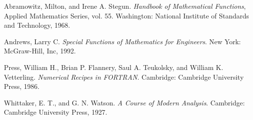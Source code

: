 \documentclass{article}
\begin{document}
\begin{thebibliography}{99}

 Abramowitz, Milton, and Irene A. Stegun.
  \emph{Handbook of Mathematical Functions}, Applied Mathematics
  Series, vol. 55.  Washington: National Institute of Standards and
  Technology, 1968.

 Andrews, Larry C. \emph{Special Functions of
    Mathematics for Engineers}.  New York: McGraw-Hill, Inc, 1992.

 Press, William H., Brian P. Flannery, Saul
  A. Teukolsky, and William K. Vetterling.  \emph{Numerical Recipes in
    FORTRAN}.  Cambridge: Cambridge University Press, 1986.

 Whittaker, E. T., and G. N. Watson.  \emph{A
    Course of Modern Analysis}.  Cambridge: Cambridge University
  Press, 1927.

\end{thebibliography}
\end{document}

